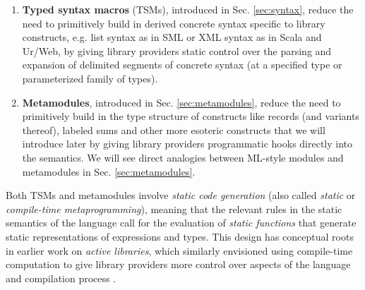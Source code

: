 \begin{enumerate}
\item \textbf{Typed syntax macros} (TSMs), introduced in Sec. \ref{sec:syntax}, reduce the need to primitively build in derived concrete syntax specific to library constructs, e.g. list syntax as in SML or XML syntax as in Scala and Ur/Web, by giving library providers static control over the parsing and expansion of delimited segments of concrete syntax (at a specified type or parameterized family of types). %
\item \textbf{Metamodules}, introduced in Sec. \ref{sec:metamodules}, reduce the need to primitively build in the type structure of constructs like records (and variants thereof),  labeled sums and other more esoteric constructs that we will introduce later by giving library providers programmatic hooks directly into the semantics. %
We will see direct analogies between ML-style modules and metamodules in Sec. \ref{sec:metamodules}.
\end{enumerate} 
Both TSMs and metamodules involve \emph{static code generation} (also called \emph{static} or \emph{compile-time metaprogramming}), meaning that the relevant rules in the static semantics of the language call for the evaluation of \emph{static functions} that generate static representations of expressions and types. %
This design has conceptual roots in earlier work on \emph{active libraries}, which similarly envisioned using compile-time computation to give library providers more control over aspects of the language and compilation process \cite{active-libraries-thesis}. %

